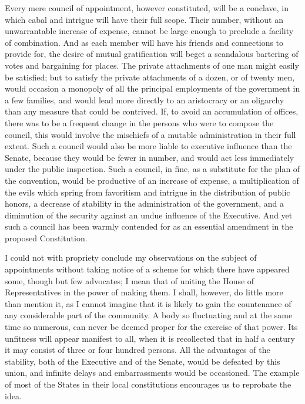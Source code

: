 Every mere council of appointment, however constituted, will be a conclave, in which cabal and intrigue will have their full scope. Their number, without an unwarrantable increase of expense, cannot be large enough to preclude a facility of combination. And as each member will have his friends and connections to provide for, the desire of mutual gratification will beget a scandalous bartering of votes and bargaining for places. The private attachments of one man might easily be satisfied; but to satisfy the private attachments of a dozen, or of twenty men, would occasion a monopoly of all the principal employments of the government in a few families, and would lead more directly to an aristocracy or an oligarchy than any measure that could be contrived. If, to avoid an accumulation of offices, there was to be a frequent change in the persons who were to compose the council, this would involve the mischiefs of a mutable administration in their full extent. Such a council would also be more liable to executive influence than the Senate, because they would be fewer in number, and would act less immediately under the public inspection. Such a council, in fine, as a substitute for the plan of the convention, would be productive of an increase of expense, a multiplication of the evils which spring from favoritism and intrigue in the distribution of public honors, a decrease of stability in the administration of the government, and a diminution of the security against an undue influence of the Executive. And yet such a council has been warmly contended for as an essential amendment in the proposed Constitution.

I could not with propriety conclude my observations on the subject of appointments without taking notice of a scheme for which there have appeared some, though but few advocates; I mean that of uniting the House of Representatives in the power of making them. I shall, however, do little more than mention it, as I cannot imagine that it is likely to gain the countenance of any considerable part of the community. A body so fluctuating and at the same time so numerous, can never be deemed proper for the exercise of that power. Its unfitness will appear manifest to all, when it is recollected that in half a century it may consist of three or four hundred persons. All the advantages of the stability, both of the Executive and of the Senate, would be defeated by this union, and infinite delays and embarrassments would be occasioned. The example of most of the States in their local constitutions encourages us to reprobate the idea.

